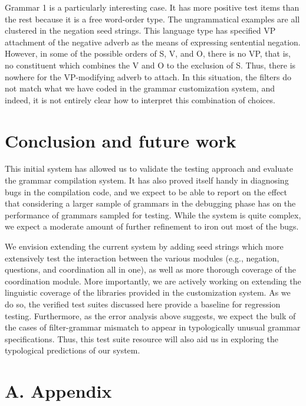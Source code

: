 \documentclass[11pt]{article}
\begin{document}
Grammar 1 is a particularly interesting case.  It has more positive
test items than the rest because it is a free word-order type.  The
ungrammatical examples are all clustered in the negation seed strings.
This language type has specified VP attachment of the negative adverb as
the means of expressing sentential negation.  However, in some of the
possible orders of S, V, and O, there is no VP, that is, no constituent
which combines the V and O to the exclusion of S.  Thus, there is nowhere
for the VP-modifying adverb to attach.  In this situation, the filters
do not match what we have coded in the grammar customization system, and
indeed, it is not entirely clear how to interpret this combination of
choices.  

\section{Conclusion and future work}

This initial system has allowed us to validate the testing approach
and evaluate the grammar compilation system.  It has also proved
itself handy in diagnosing bugs in the compilation code, and we
expect to be able to report on the effect that considering a larger
sample of grammars in the debugging phase has on the performance
of grammars sampled for testing.  While the system is quite complex,
we expect a moderate amount of further refinement to iron out most
of the bugs.

We envision extending the current system by adding seed strings which
more extensively test the interaction between the various modules
(e.g., negation, questions, and coordination all in one), as well as
more thorough coverage of the coordination module.  More importantly,
we are actively working on extending the linguistic coverage of the
libraries provided in the customization system.  As we do so, the
verified test suites discussed here provide a baseline for regression
testing.  Furthermore, as the error analysis above suggests, we expect
the bulk of the cases of filter-grammar mismatch to appear in
typologically unusual grammar specifications.  Thus, this test suite
resource will also aid us in exploring the typological predictions of
our system.





\section*{A. Appendix}
\end{document}

